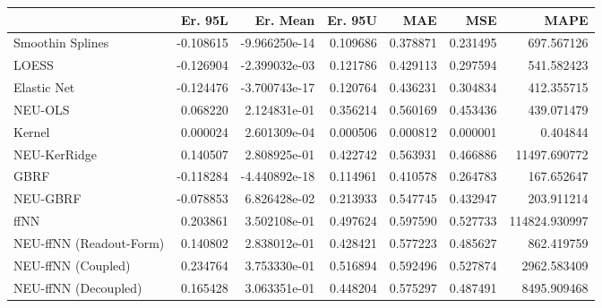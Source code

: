 \begin{tabular}{lrrrrrr}
\toprule
{} &   Er. 95L &      Er. Mean &   Er. 95U &       MAE &       MSE &           MAPE \\
\midrule
Smoothin Splines        & -0.108615 & -9.966250e-14 &  0.109686 &  0.378871 &  0.231495 &     697.567126 \\
LOESS                   & -0.126904 & -2.399032e-03 &  0.121786 &  0.429113 &  0.297594 &     541.582423 \\
Elastic Net             & -0.124476 & -3.700743e-17 &  0.120764 &  0.436231 &  0.304834 &     412.355715 \\
NEU-OLS                 &  0.068220 &  2.124831e-01 &  0.356214 &  0.560169 &  0.453436 &     439.071479 \\
Kernel                  &  0.000024 &  2.601309e-04 &  0.000506 &  0.000812 &  0.000001 &       0.404844 \\
NEU-KerRidge            &  0.140507 &  2.808925e-01 &  0.422742 &  0.563931 &  0.466886 &   11497.690772 \\
GBRF                    & -0.118284 & -4.440892e-18 &  0.114961 &  0.410578 &  0.264783 &     167.652647 \\
NEU-GBRF                & -0.078853 &  6.826428e-02 &  0.213933 &  0.547745 &  0.432947 &     203.911214 \\
ffNN                    &  0.203861 &  3.502108e-01 &  0.497624 &  0.597590 &  0.527733 &  114824.930997 \\
NEU-ffNN (Readout-Form) &  0.140802 &  2.838012e-01 &  0.428421 &  0.577223 &  0.485627 &     862.419759 \\
NEU-ffNN (Coupled)      &  0.234764 &  3.753330e-01 &  0.516894 &  0.592496 &  0.527874 &    2962.583409 \\
NEU-ffNN (Decoupled)    &  0.165428 &  3.063351e-01 &  0.448204 &  0.575297 &  0.487491 &    8495.909468 \\
\bottomrule
\end{tabular}
